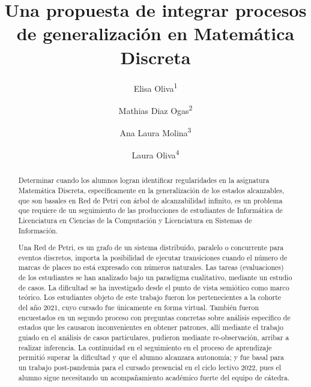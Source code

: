 \documentclass[oneside,spanish]{amsart}
\numberwithin{equation}{section}
\theoremstyle{definition}
\begin{document}
	
\title[Una propuesta de integrar procesos de generalización en Matemática Discreta]{Una propuesta de integrar procesos de generalización en Matemática Discreta\vspace{-2ex}}
\author[1]{Elisa Oliva\textsuperscript{1}}
\author[2]{Mathias Diaz Ogas\textsuperscript{2}}
\author[3]{Ana Laura Molina\textsuperscript{3}}
\author[4]{Laura Oliva\textsuperscript{4}}
\address[2,3]{Facultad de Ciencias Exactas, Físicas y Naturales, Universidad Nacional de San Juan}
\address[4]{Facultad de Ingeniería, Universidad Nacional de San Juan}

\begin{abstract}
	Determinar cuando los alumnos logran identificar regularidades en la asignatura Matemática Discreta, específicamente en la generalización de los estados alcanzables, que son basales en Red de Petri con árbol de alcanzabilidad infinito, es un problema que requiere de un seguimiento de las producciones de estudiantes de Informática de Licenciatura en Ciencias de la Computación y Licenciatura en Sistemas de Información.
	
	Una Red de Petri, es un grafo de un sistema distribuido, paralelo o concurrente para eventos discretos, importa la posibilidad de ejecutar transiciones cuando el número de marcas de places no está expresado con números naturales. Las tareas (evaluaciones) de los estudiantes se han analizado bajo un paradigma cualitativo, mediante un estudio de casos. La dificultad se ha investigado desde el punto de vista semiótico como marco teórico. Los estudiantes objeto de este trabajo fueron los pertenecientes a la cohorte del año 2021, cuyo cursado fue únicamente en forma virtual. También fueron encuestados en un segundo proceso con preguntas concretas sobre análisis específico de estados que les causaron inconvenientes en obtener patrones, allí mediante el trabajo guiado en el análisis de casos particulares, pudieron mediante re-observación, arribar a realizar inferencia. La continuidad en el seguimiento en el proceso de aprendizaje permitió superar la dificultad y que el alumno alcanzara autonomía; y fue basal para un trabajo post-pandemia para el cursado presencial en el ciclo lectivo 2022, pues el alumno sigue necesitando un acompañamiento académico fuerte del equipo de cátedra.
\end{abstract}
\end{document}
